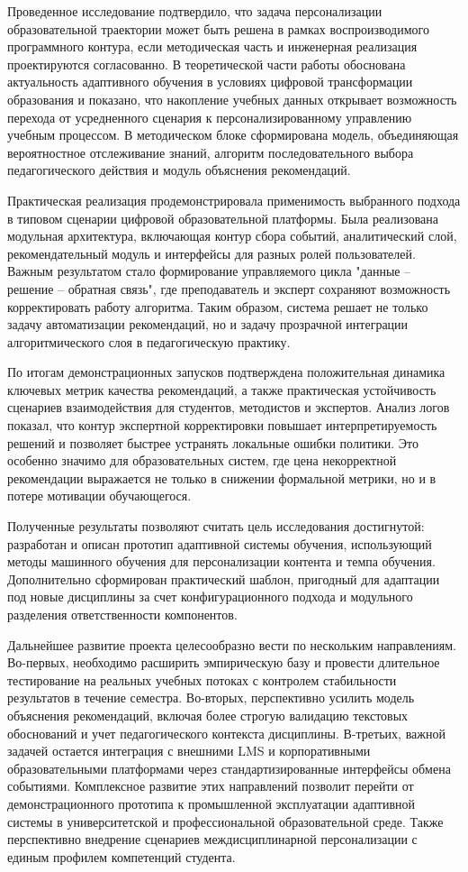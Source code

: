 Проведенное исследование подтвердило, что задача персонализации образовательной
траектории может быть решена в рамках воспроизводимого программного контура,
если методическая часть и инженерная реализация проектируются согласованно. В
теоретической части работы обоснована актуальность адаптивного обучения в
условиях цифровой трансформации образования и показано, что накопление учебных
данных открывает возможность перехода от усредненного сценария к
персонализированному управлению учебным процессом. В методическом блоке
сформирована модель, объединяющая вероятностное отслеживание знаний, алгоритм
последовательного выбора педагогического действия и модуль объяснения
рекомендаций.

Практическая реализация продемонстрировала применимость выбранного подхода в
типовом сценарии цифровой образовательной платформы. Была реализована модульная
архитектура, включающая контур сбора событий, аналитический слой,
рекомендательный модуль и интерфейсы для разных ролей пользователей. Важным
результатом стало формирование управляемого цикла "данные -- решение --
обратная связь", где преподаватель и эксперт сохраняют возможность
корректировать работу алгоритма. Таким образом, система решает не только задачу
автоматизации рекомендаций, но и задачу прозрачной интеграции алгоритмического
слоя в педагогическую практику.

По итогам демонстрационных запусков подтверждена положительная динамика
ключевых метрик качества рекомендаций, а также практическая устойчивость
сценариев взаимодействия для студентов, методистов и экспертов. Анализ логов
показал, что контур экспертной корректировки повышает интерпретируемость
решений и позволяет быстрее устранять локальные ошибки политики. Это особенно
значимо для образовательных систем, где цена некорректной рекомендации
выражается не только в снижении формальной метрики, но и в потере мотивации
обучающегося.

Полученные результаты позволяют считать цель исследования достигнутой:
разработан и описан прототип адаптивной системы обучения, использующий методы
машинного обучения для персонализации контента и темпа обучения. Дополнительно
сформирован практический шаблон, пригодный для адаптации под новые дисциплины
за счет конфигурационного подхода и модульного разделения ответственности
компонентов.

Дальнейшее развитие проекта целесообразно вести по нескольким направлениям.
Во-первых, необходимо расширить эмпирическую базу и провести длительное
тестирование на реальных учебных потоках с контролем стабильности результатов в
течение семестра. Во-вторых, перспективно усилить модель объяснения
рекомендаций, включая более строгую валидацию текстовых обоснований и учет
педагогического контекста дисциплины. В-третьих, важной задачей остается
интеграция с внешними LMS и корпоративными образовательными платформами через
стандартизированные интерфейсы обмена событиями. Комплексное развитие этих
направлений позволит перейти от демонстрационного прототипа к промышленной
эксплуатации адаптивной системы в университетской и профессиональной
образовательной среде. Также перспективно внедрение сценариев междисциплинарной
персонализации с единым профилем компетенций студента.
